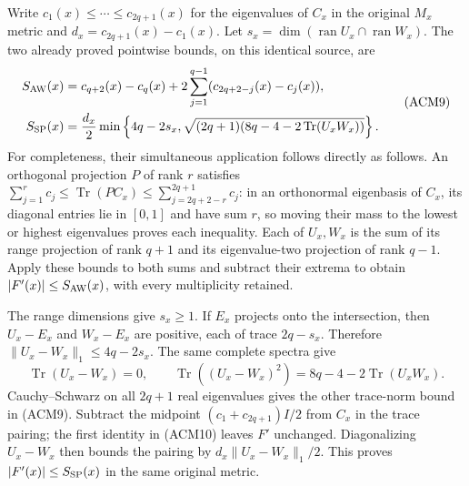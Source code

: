 Write $c_1(x)\le\cdots\le c_{2q+1}(x)$ for the eigenvalues of $C_x$
in the original $M_x$ metric and $d_x=c_{2q+1}(x)-c_1(x)$.
Let $s_x=\dim(\operatorname{ran}U_x\cap\operatorname{ran}W_x)$.
The two already proved pointwise bounds, on this identical source, are
\[
 \begin{aligned}
 S_{\rm AW}(x)&=c_{q+2}(x)-c_q(x)
       +2\sum_{j=1}^{q-1}(c_{2q+2-j}(x)-c_j(x)),\\
 S_{\rm SP}(x)&=\frac{d_x}{2}\min\left\{
       4q-2s_x,\sqrt{(2q+1)(8q-4-2\operatorname{Tr}(U_xW_x))}
                                    \right\}.
 \end{aligned}
 \tag{ACM9}
\]
For completeness, their simultaneous application follows directly as
follows. An orthogonal projection $P$ of rank $r$ satisfies
$\sum_{j=1}^r c_j\le\operatorname{Tr}(PC_x)
\le\sum_{j=2q+2-r}^{2q+1}c_j$: in an orthonormal eigenbasis of
$C_x$, its diagonal entries lie in $[0,1]$ and have sum $r$, so
moving their mass to the lowest or highest eigenvalues proves each
inequality. Each of $U_x,W_x$ is the sum of its range projection
of rank $q+1$ and its eigenvalue-two projection of rank $q-1$.
Apply these bounds to both sums and subtract their extrema to obtain
$|F'(x)|\le S_{\rm AW}(x)$, with every multiplicity retained.

The range dimensions give $s_x\ge1$. If $E_x$ projects onto the
intersection, then $U_x-E_x$ and $W_x-E_x$ are positive, each of
trace $2q-s_x$. Therefore
$\|U_x-W_x\|_1\le4q-2s_x$. The same complete spectra give
\[
 \operatorname{Tr}(U_x-W_x)=0,\qquad
 \operatorname{Tr}((U_x-W_x)^2)
       =8q-4-2\operatorname{Tr}(U_xW_x).
 \tag{ACM10}
\]
Cauchy--Schwarz on all $2q+1$ real eigenvalues gives the other
trace-norm bound in (ACM9). Subtract the midpoint
$(c_1+c_{2q+1})I/2$ from $C_x$ in the trace pairing; the first
identity in (ACM10) leaves $F'$ unchanged. Diagonalizing $U_x-W_x$
then bounds the pairing by $d_x\|U_x-W_x\|_1/2$. This proves
$|F'(x)|\le S_{\rm SP}(x)$ in the same original metric.

